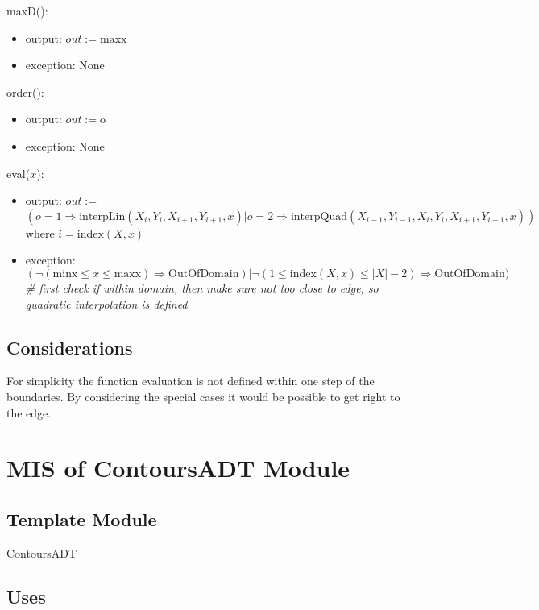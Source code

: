 \documentclass[12pt, titlepage]{article}
\begin{document}
\noindent maxD():
\begin{itemize}
\item output: $out := \mbox{maxx}$
\item exception: None
\end{itemize}

\noindent order():
\begin{itemize}
\item output: $out := \mbox{o}$
\item exception: None
\end{itemize}

\noindent eval($x$):
\begin{itemize}
\item output: $out :=$ $$(o=1 \Rightarrow \mbox{interpLin}(X_i, Y_i,
X_{i+1}, Y_{i+1}, x) | o = 2 \Rightarrow \mbox{interpQuad}(X_{i-1}, Y_{i-1}, X_i, Y_i, X_{i+1},
Y_{i+1}, x) )$$  where $i = \mbox{index}(X, x)$
\item exception: $(\neg(\mbox{minx} \leq x \leq \mbox{maxx}) \Rightarrow
  \mbox{OutOfDomain}) | \neg(1 \leq \mbox{index}(X, x) \leq |X| - 2) \Rightarrow
  \mbox{OutOfDomain})$ \textit{\# first check if within domain, then make sure
    not too close to edge, so quadratic interpolation is defined}
\end{itemize}

\subsection{Considerations}

For simplicity the function evaluation is not defined within one step of the
boundaries.  By considering the special cases it would be possible to get right 
to the edge.

\newpage


\section{MIS of ContoursADT Module} \label{ContoursADT}

\subsection {Template Module}

ContoursADT

\subsection {Uses}
\end{document}

